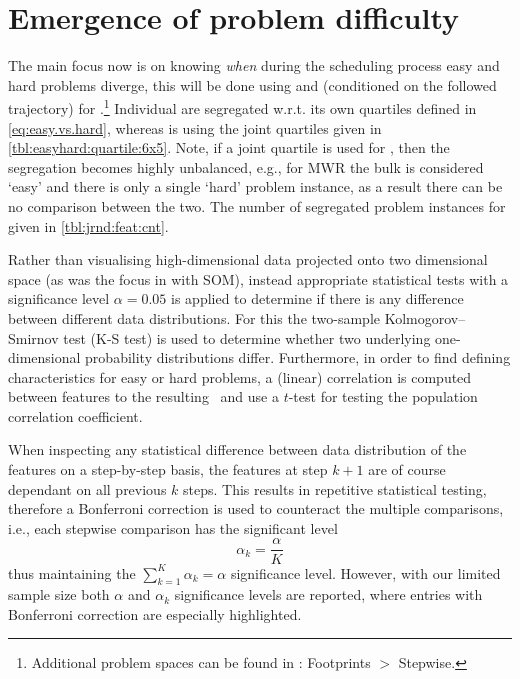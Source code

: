 \clearpage
\section{Emergence of problem difficulty}\label{sec:diff:stepwise}


The main focus now is on knowing \emph{when} during the scheduling process easy 
and hard problems diverge, this will be done using \PhiSet{\ALL} and 
\PhiSet{\SDR} (conditioned on the followed trajectory) for 
.\footnote{Additional problem spaces can be
    found in \shiny: Footprints $>$ Stepwise.}
Individual \PhiSet{\SDR} are segregated w.r.t. its own quartiles defined 
in \cref{eq:easy.vs.hard}, whereas \PhiSet{\ALL} is using the joint quartiles 
given in \cref{tbl:easyhard:quartile:6x5}. 
Note, if a joint quartile is used for \PhiSet{\SDR}, then the segregation 
becomes highly unbalanced, e.g., for MWR the bulk is considered `easy' and 
there is only a single `hard' problem instance, as a result there 
can be no comparison between the two. 
The number of segregated problem instances for given in 
\cref{tbl:jrnd:feat:cnt}.

Rather than visualising high-dimensional data projected onto two dimensional 
space (as was the focus in \cite{SmithMilesLion5} with SOM), 
instead appropriate statistical tests with a significance level $\alpha=0.05$ 
is applied to determine if there is any difference between different data 
distributions. 
For this the two-sample Kolmogorov–Smirnov test (K-S test) is used to determine 
whether two underlying one-dimensional probability distributions differ. 
Furthermore, in order to find defining characteristics for easy or hard 
problems, a (linear) correlation is computed between features to the resulting 
\namerho\ and use a $t$-test for testing the population correlation 
coefficient. 

When inspecting any statistical difference between data distribution of 
the features on a step-by-step basis, the features at step $k+1$ are of course 
dependant on all previous $k$ steps. This results in repetitive statistical 
testing, therefore a Bonferroni correction is used to counteract the multiple 
comparisons, i.e., each stepwise comparison has the significant level
\begin{equation}
\alpha_k=\frac{\alpha}{K}
\end{equation} 
thus maintaining the $\sum_{k=1}^K\alpha_k=\alpha$ significance level. 
However, with our limited sample size both $\alpha$ and $\alpha_k$ significance 
levels are reported, where entries with Bonferroni correction are especially 
highlighted.


